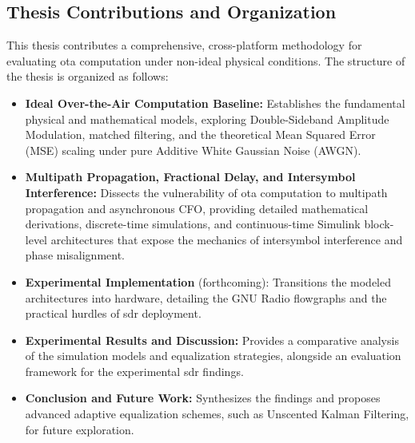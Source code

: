 \documentclass[Markos_Delaportas_1316.tex]{subfiles}
\begin{document}
\subsection{Thesis Contributions and Organization}
This thesis contributes a comprehensive, cross-platform methodology
for evaluating \gls{ota}
computation under non-ideal physical conditions. The structure of the
thesis is organized
as follows:
\begin{itemize}
    \item \textbf{Ideal Over-the-Air Computation Baseline:}
        Establishes the fundamental physical and mathematical models,
        exploring Double-Sideband Amplitude Modulation, matched
        filtering, and the theoretical Mean Squared Error (MSE)
        scaling under pure Additive White Gaussian Noise (AWGN).
    \item \textbf{Multipath Propagation, Fractional Delay, and
        Intersymbol Interference:} Dissects the vulnerability of
        \gls{ota} computation to multipath propagation and
        asynchronous CFO, providing detailed mathematical
        derivations, discrete-time simulations, and continuous-time
        Simulink block-level architectures that expose the mechanics
        of intersymbol interference and phase misalignment.
    \item \textbf{Experimental Implementation} (forthcoming):
        Transitions the modeled architectures into hardware,
        detailing the GNU Radio flowgraphs and the practical hurdles
        of \gls{sdr} deployment.
    \item \textbf{Experimental Results and Discussion:} Provides a
        comparative analysis of the simulation models and
        equalization strategies, alongside an evaluation framework
        for the experimental \gls{sdr} findings.
    \item \textbf{Conclusion and Future Work:} Synthesizes the
        findings and proposes advanced adaptive equalization schemes,
        such as Unscented Kalman Filtering, for future exploration.
\end{itemize}

\ifSubfilesClassLoaded{
    \clearpage
    \printbibliography
}{}
\end{document}

